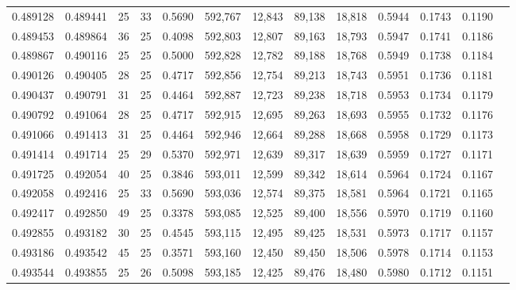 \begin{tabular}{rrrrrrrrrrrrr}
0.489128 & 0.489441 &    25 &  33 &                                     0.5690 & 592,767 &  12,843 &  89,138 &  18,818 & 0.5944 & 0.1743 & 0.1190 \\
0.489453 & 0.489864 &    36 &  25 &                                     0.4098 & 592,803 &  12,807 &  89,163 &  18,793 & 0.5947 & 0.1741 & 0.1186 \\
0.489867 & 0.490116 &    25 &  25 &                                     0.5000 & 592,828 &  12,782 &  89,188 &  18,768 & 0.5949 & 0.1738 & 0.1184 \\
0.490126 & 0.490405 &    28 &  25 &                                     0.4717 & 592,856 &  12,754 &  89,213 &  18,743 & 0.5951 & 0.1736 & 0.1181 \\
0.490437 & 0.490791 &    31 &  25 &                                     0.4464 & 592,887 &  12,723 &  89,238 &  18,718 & 0.5953 & 0.1734 & 0.1179 \\
0.490792 & 0.491064 &    28 &  25 &                                     0.4717 & 592,915 &  12,695 &  89,263 &  18,693 & 0.5955 & 0.1732 & 0.1176 \\
0.491066 & 0.491413 &    31 &  25 &                                     0.4464 & 592,946 &  12,664 &  89,288 &  18,668 & 0.5958 & 0.1729 & 0.1173 \\
0.491414 & 0.491714 &    25 &  29 &                                     0.5370 & 592,971 &  12,639 &  89,317 &  18,639 & 0.5959 & 0.1727 & 0.1171 \\
0.491725 & 0.492054 &    40 &  25 &                                     0.3846 & 593,011 &  12,599 &  89,342 &  18,614 & 0.5964 & 0.1724 & 0.1167 \\
0.492058 & 0.492416 &    25 &  33 &                                     0.5690 & 593,036 &  12,574 &  89,375 &  18,581 & 0.5964 & 0.1721 & 0.1165 \\
0.492417 & 0.492850 &    49 &  25 &                                     0.3378 & 593,085 &  12,525 &  89,400 &  18,556 & 0.5970 & 0.1719 & 0.1160 \\
0.492855 & 0.493182 &    30 &  25 &                                     0.4545 & 593,115 &  12,495 &  89,425 &  18,531 & 0.5973 & 0.1717 & 0.1157 \\
0.493186 & 0.493542 &    45 &  25 &                                     0.3571 & 593,160 &  12,450 &  89,450 &  18,506 & 0.5978 & 0.1714 & 0.1153 \\
0.493544 & 0.493855 &    25 &  26 &                                     0.5098 & 593,185 &  12,425 &  89,476 &  18,480 & 0.5980 & 0.1712 & 0.1151 \\

\end{tabular}
